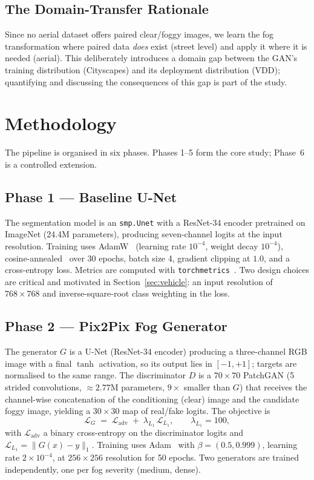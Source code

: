 \documentclass[11pt,a4paper]{article}
\begin{document}
\subsection{The Domain-Transfer Rationale}
Since no aerial dataset offers paired clear/foggy images, we learn the fog
transformation where paired data \emph{does} exist (street level) and apply it
where it is needed (aerial). This deliberately introduces a domain gap between
the GAN's training distribution (Cityscapes) and its deployment distribution
(VDD); quantifying and discussing the consequences of this gap is part of the
study.

\section{Methodology}

The pipeline is organised in six phases. Phases 1--5 form the core study;
Phase~6 is a controlled extension.

\subsection{Phase 1 --- Baseline U-Net}
The segmentation model is an \texttt{smp.Unet} with a ResNet-34 encoder
pretrained on ImageNet (24.4M parameters), producing seven-channel logits at
the input resolution. Training uses AdamW~\cite{loshchilov2019adamw}
(learning rate $10^{-4}$, weight decay $10^{-4}$),
cosine-annealed~\cite{loshchilov2017sgdr} over 30 epochs, batch size 4,
gradient clipping at $1.0$, and a cross-entropy loss. Metrics are computed
with \texttt{torchmetrics}~\cite{torchmetrics}. Two design choices are critical
and motivated in Section~\ref{sec:vehicle}: an input resolution of
$768\times768$ and inverse-square-root class weighting in the loss.

\subsection{Phase 2 --- Pix2Pix Fog Generator}
The generator $G$ is a U-Net (ResNet-34 encoder) producing a three-channel RGB
image with a final $\tanh$ activation, so its output lies in $[-1,+1]$;
targets are normalised to the same range. The discriminator $D$ is a
$70\times70$ PatchGAN (5 strided convolutions, $\approx 2.77$M parameters,
$9\times$ smaller than $G$) that receives the channel-wise concatenation of
the conditioning (clear) image and the candidate foggy image, yielding a
$30\times30$ map of real/fake logits. The objective is
\begin{equation}
\mathcal{L}_{G} \;=\; \mathcal{L}_{\text{adv}} \;+\; \lambda_{L_1}\,
\mathcal{L}_{L_1}, \qquad \lambda_{L_1}=100,
\end{equation}
with $\mathcal{L}_{\text{adv}}$ a binary cross-entropy on the discriminator
logits and $\mathcal{L}_{L_1}=\lVert G(x)-y\rVert_1$. Training uses
Adam~\cite{kingma2015adam} with
$\beta=(0.5,0.999)$, learning rate $2\times10^{-4}$, at $256\times256$
resolution for 50 epochs. Two generators are trained independently, one per
fog severity (medium, dense).
\end{document}
